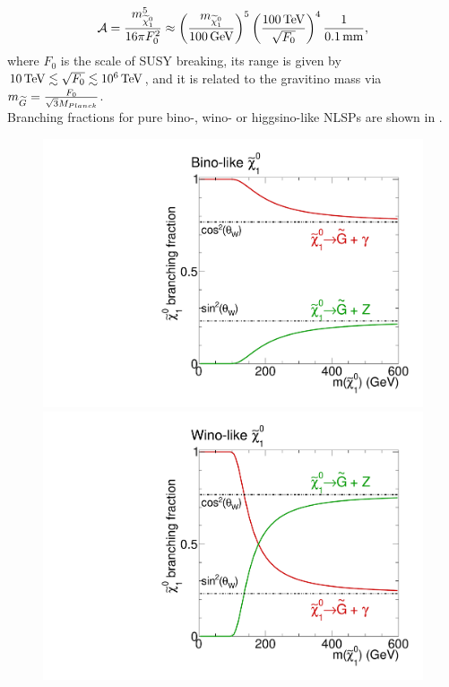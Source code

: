 \begin{equation}
 \mathcal{A} = \frac{m_{\widetilde{\chi}^{0}_{1}}^5}{16\pi F_{0}^{2}}\approx\left(\frac{m_{\widetilde{\chi}^{0}_{1}}}{100\,\text{Ge\hspace{-.08em}V}}\right)^5\left(\frac{100\,\text{Te\hspace{-.08em}V}}{\sqrt{F_0}}\right)^4 \frac{1}{0.1\,\text{mm}},
\end{equation}
where $F_0$ is the scale of SUSY breaking, its  range is given by $10\,\text{Te\hspace{-.08em}V}\lesssim\sqrt{F_0}\lesssim10^6\,\text{Te\hspace{-.08em}V}$, and it is related to the gravitino mass via $m_{\widetilde{G}}=\frac{F_0}{\sqrt{3}M_{Planck}}$.\\
Branching fractions for pure bino-, wino- or higgsino-like NLSPs are shown in .
\begin{figure}[htb]
 \centering
 \includegraphics[width=\pairwidth]{figures/signal/binoBranching}
 \includegraphics[width=\pairwidth]{figures/signal/winoBranching}\\

\end{figure}
